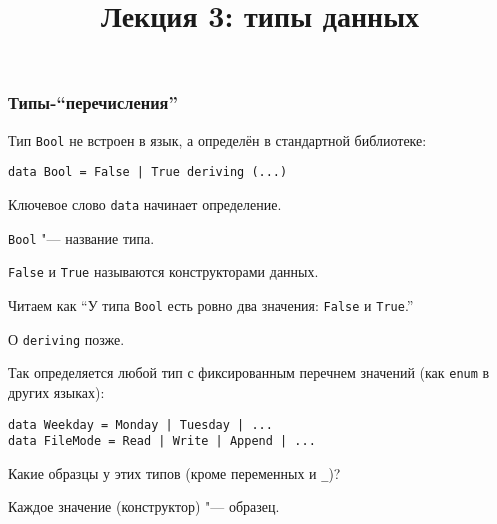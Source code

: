 \documentclass[10pt]{beamer}
\title{Лекция 3: типы данных}
\begin{document}
\begin{frame}[plain]
  \maketitle
\end{frame}

\begin{frame}[fragile]
  \frametitle{Типы-\enquote{перечисления}}
  \begin{itemize}
    \item Тип \lstinline|Bool| не встроен в язык, а определён в стандартной библиотеке:
          \begin{lstlisting}
data Bool = False | True deriving (...)
\end{lstlisting}
    \item Ключевое слово \lstinline|data| начинает определение.
    \item \lstinline|Bool| "--- название типа.
    \item \lstinline|False| и \lstinline|True| называются конструкторами данных.
    \item Читаем как \enquote{У типа \lstinline|Bool| есть ровно два значения: \lstinline|False| и \lstinline|True|.}
           { \item О \lstinline|deriving| позже. }
          \pause
    \item Так определяется любой тип с фиксированным перечнем значений (как \lstinline|enum| в других языках):
          \begin{lstlisting}
data Weekday = Monday | Tuesday | ...
data FileMode = Read | Write | Append | ...
\end{lstlisting}
    \item Какие образцы у этих типов (кроме переменных и \lstinline|_|)? \pause
    \item Каждое значение (конструктор) "--- образец.
  \end{itemize}
\end{frame}
\end{document}
